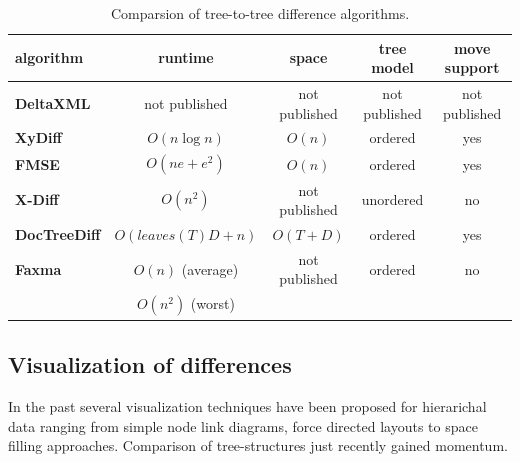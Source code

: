 \begin{table}[tb]
\centering 
\begin{tabular}[r]{|l|c|c|c|c|} 
\hline
\textbf{algorithm} & \textbf{runtime} & \textbf{space} & \textbf{tree model} & \textbf{move support}\\
\hline
\hline
\textbf{DeltaXML} & not published & not published & not published & not published\\
\hline
\textbf{XyDiff} & $O(n \log n)$ & $O(n)$ & ordered & yes\\
\hline
\textbf{FMSE} & $O(n e + e^2)$ & $O(n)$ & ordered & yes\\
\hline
\textbf{X-Diff} & $O(n^2)$ & not published & unordered & no\\
\hline
\textbf{DocTreeDiff} & $O(leaves(T)D + n)$ & $O(T+D)$ & ordered & yes\\
\hline
\textbf{Faxma} & $O(n)$ (average) & not published & ordered & no\\
& $O(n^2)$ (worst) &  & & \\
\hline
\end{tabular}
\label{chap2:comparsion}
\vspace{0.5em} 
\caption{Comparsion of tree-to-tree difference algorithms.}
\end{table}

\subsection{Visualization of differences}
In the past several visualization techniques have been proposed for hierarichal data ranging from simple node link diagrams, force directed layouts to space filling approaches. Comparison of tree-structures just recently gained momentum. %


